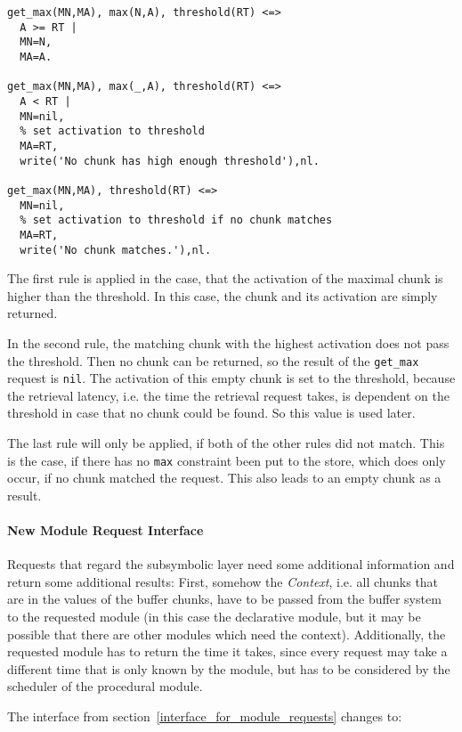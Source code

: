 \begin{lstlisting}
get_max(MN,MA), max(N,A), threshold(RT) <=> 
  A >= RT | 
  MN=N,
  MA=A.
  
get_max(MN,MA), max(_,A), threshold(RT) <=> 
  A < RT | 
  MN=nil,
  % set activation to threshold
  MA=RT,
  write('No chunk has high enough threshold'),nl.
  
get_max(MN,MA), threshold(RT) <=>
  MN=nil,
  % set activation to threshold if no chunk matches
  MA=RT,
  write('No chunk matches.'),nl.
\end{lstlisting}

The first rule is applied in the case, that the activation of the maximal chunk is higher than the threshold. In this case, the chunk and its activation are simply returned.

In the second rule, the matching chunk with the highest activation does not pass the threshold. Then no chunk can be returned, so the result of the \lstinline|get_max| request is \lstinline|nil|. The activation of this empty chunk is set to the threshold, because the retrieval latency, i.e. the time the retrieval request takes, is dependent on the threshold in case that no chunk could be found. So this value is used later.

The last rule will only be applied, if both of the other rules did not match. This is the case, if there has no \lstinline|max| constraint been put to the store, which does only occur, if no chunk matched the request. This also leads to an empty chunk as a result.

\paragraph{New Module Request Interface}

Requests that regard the subsymbolic layer need some additional information and return some additional results: First, somehow the \emph{Context}, i.e. all chunks that are in the values of the buffer chunks, have to be passed from the buffer system to the requested module (in this case the declarative module, but it may be possible that there are other modules which need the context). Additionally, the requested module has to return the time it takes, since every request may take a different time that is only known by the module, but has to be considered by the scheduler of the procedural module.

The interface from section~\ref{interface_for_module_requests} changes to:

